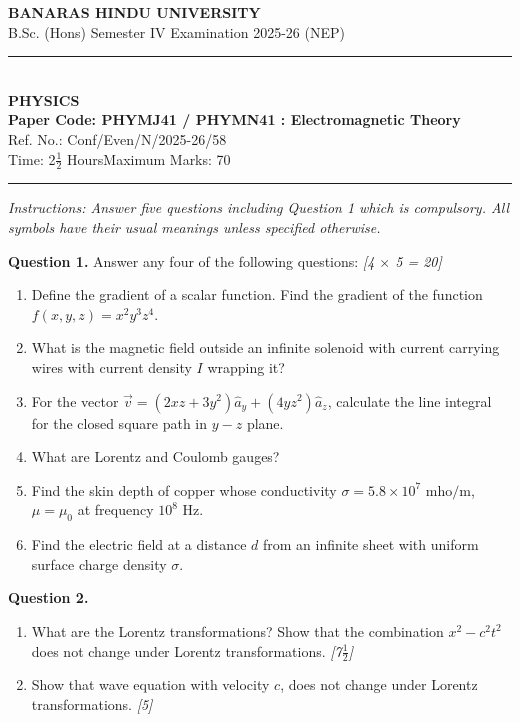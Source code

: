 \documentclass[11pt,a4paper]{article}
\newcommand{\pts}[1]{\hfill \textit{[#1]}}
\begin{document}
\begin{center}
  {\large\bfseries BANARAS HINDU UNIVERSITY}\\[2pt]
  {\normalsize B.Sc. (Hons) Semester IV Examination 2025-26 (NEP)}\\[6pt]
  \rule{0.8\linewidth}{0.5pt}\\[6pt]
  {\large\bfseries PHYSICS}\\[4pt]
  {\large\bfseries Paper Code: PHYMJ41 / PHYMN41 : Electromagnetic Theory}\\[2pt]
  {\small Ref. No.: Conf/Even/N/2025-26/58}\\[4pt]
  {\normalsize Time: 2$\frac{1}{2}$ Hours\hfill Maximum Marks: 70}
\end{center}

\rule{\linewidth}{0.4pt}

\smallskip

\noindent \textit{Instructions: Answer five questions including Question 1 which is compulsory. All symbols have their usual meanings unless specified otherwise.}

\bigskip

\noindent \textbf{Question 1.} Answer any four of the following questions: \pts{4 $\times$ 5 = 20}
\begin{enumerate}[label=(\alph*)]
  \item Define the gradient of a scalar function. Find the gradient of the function $f(x, y, z) = x^2 y^3 z^4$.
  \item What is the magnetic field outside an infinite solenoid with current carrying wires with current density $I$ wrapping it?
  \item For the vector $\vec{v} = (2xz + 3y^2)\hat{a}_y + (4yz^2)\hat{a}_z$, calculate the line integral for the closed square path in $y-z$ plane.
  \item What are Lorentz and Coulomb gauges?
  \item Find the skin depth of copper whose conductivity $\sigma = 5.8 \times 10^7\text{ mho/m}$, $\mu = \mu_0$ at frequency $10^8\text{ Hz}$.
  \item Find the electric field at a distance $d$ from an infinite sheet with uniform surface charge density $\sigma$.
\end{enumerate}

\bigskip

\noindent \textbf{Question 2.}
\begin{enumerate}[label=(\alph*)]
  \item What are the Lorentz transformations? Show that the combination $x^2 - c^2 t^2$ does not change under Lorentz transformations. \pts{7$\frac{1}{2}$}
  \item Show that wave equation with velocity $c$, does not change under Lorentz transformations. \pts{5}
\end{enumerate}
\end{document}
